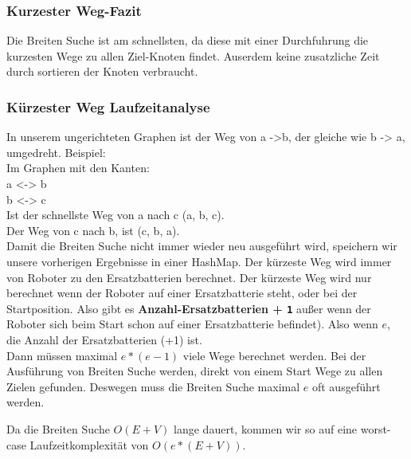 \documentclass[a4paper,12pt,arial]{scrartcl}
\begin{document}
\subsubsection{Kurzester Weg-Fazit}


Die Breiten Suche ist am schnellsten, da diese mit einer Durchfuhrung die kurzesten Wege zu allen Ziel-Knoten findet. Auserdem keine zusatzliche Zeit durch sortieren der Knoten verbraucht.



\par

\subsubsection{Kürzester Weg Laufzeitanalyse}
In unserem ungerichteten Graphen ist der Weg von a ->b, der gleiche wie b -> a, umgedreht.
Beispiel: \\
Im Graphen mit den Kanten:\\
a <-> b \\
b <-> c\\
Ist der schnellste Weg von a nach c (a, b, c). \\
Der Weg von c nach b, ist (c, b, a). \\
Damit die Breiten Suche nicht immer wieder neu ausgeführt wird, speichern wir unsere vorherigen Ergebnisse in einer HashMap. 
Der kürzeste Weg wird immer von Roboter zu den Ersatzbatterien berechnet. Der kürzeste Weg wird nur berechnet wenn der Roboter auf einer Ersatzbatterie steht, oder bei der Startposition.
Also gibt es  \textbf{Anzahl-Ersatzbatterien + \texttt{1}} außer wenn der Roboter sich beim Start schon auf einer Ersatzbatterie befindet).
Also wenn $e$, die Anzahl der Ersatzbatterien (+1) ist. \\
Dann müssen maximal $e * (e-1)$ viele Wege berechnet werden.
Bei der Ausführung von Breiten Suche werden, direkt von einem Start Wege zu allen Zielen gefunden.
Deswegen muss die Breiten Suche maximal $e$ oft ausgeführt werden.

Da die Breiten Suche $O(E+V)$ lange dauert, kommen wir so auf eine worst-case Laufzeitkomplexität von $O(e * (E + V))$.
\end{document}
